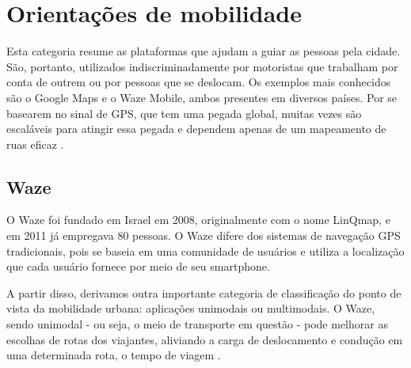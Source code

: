 \section{Orientações de mobilidade}

Esta categoria resume as plataformas que ajudam a guiar as pessoas pela cidade. São, portanto, utilizados indiscriminadamente por motoristas que trabalham por conta de outrem ou por pessoas que se deslocam. Os exemplos mais conhecidos são o Google Maps e o Waze Mobile, ambos presentes em diversos países. Por se basearem no sinal de GPS, que tem uma pegada global, muitas vezes são escaláveis para atingir essa pegada e dependem apenas de um mapeamento de ruas eficaz \cite{caronae}.


\subsection{Waze}

O Waze foi fundado em Israel em 2008, originalmente com o nome LinQmap, e em 2011 já empregava 80 pessoas. O Waze difere dos sistemas de navegação GPS tradicionais, pois se baseia em uma comunidade de usuários e utiliza a localização que cada usuário fornece por meio de seu smartphone.


A partir disso, derivamos outra importante categoria de classificação do ponto de vista da mobilidade urbana: aplicações unimodais ou multimodais. O Waze, sendo unimodal - ou seja, o meio de transporte em questão - pode melhorar as escolhas de rotas dos viajantes, aliviando a carga de deslocamento e condução em uma determinada rota, o tempo de viagem \cite{caronae}.


